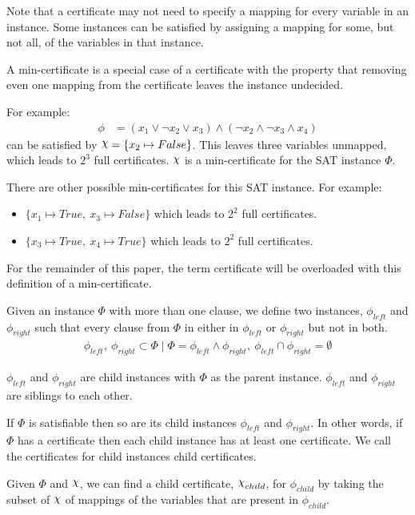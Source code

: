 Note that a certificate may not need to specify a mapping for every variable in an instance.
Some instances can be satisfied by assigning a mapping for some, but not all, of the variables in that instance.

\begin{definition}
\label{def:min-certificate}
    A min-certificate is a special case of a certificate with the property that removing even one mapping from the certificate leaves the instance undecided.
\end{definition}

For example:
\begin{align*}
    \phi & = (x_1 \lor \lnot x_2 \lor x_3) \land (\lnot x_2 \land \lnot x_3 \land x_4)
\end{align*}
can be satisfied by $ \rchi = \{ x_2 \mapsto False \} $.
This leaves three variables unmapped, which leads to $2^3$ full certificates.
$\rchi$ is a min-certificate for the SAT instance $\Phi$.

There are other possible min-certificates for this SAT instance.
For example:
\begin{itemize}
    \item $\{ x_1 \mapsto True,~ x_3 \mapsto False \}$ which leads to $2^2$ full certificates.
    \item $\{ x_3 \mapsto True,~ x_4 \mapsto True \}$ which leads to $2^2$ full certificates.
\end{itemize}

For the remainder of this paper, the term certificate will be overloaded with this definition of a min-certificate.

\begin{definition}
\label{def:child-instances}
    Given an instance $\Phi$ with more than one clause, we define two instances, $\phi_{left}$ and $\phi_{right}$ such that every clause from $\Phi$ in either in $\phi_{left}$ or $\phi_{right}$ but not in both.
    \begin{align*}
        \phi_{left},~ \phi_{right} \subset \Phi
        \mid \Phi = \phi_{left} \land \phi_{right},~
        \phi_{left} \cap \phi_{right} = \emptyset
    \end{align*}

    $\phi_{left}$ and $\phi_{right}$ are child instances with $\Phi$ as the parent instance.
    $\phi_{left}$ and $\phi_{right}$ are siblings to each other.
\end{definition}

\begin{definition}
\label{def:child-certificates}
    If $\Phi$ is satisfiable then so are its child instances $\phi_{left}$ and $\phi_{right}$.
    In other words, if $\Phi$ has a certificate then each child instance has at least one certificate.
    We call the certificates for child instances child certificates.

    Given $\Phi$ and $\rchi$, we can find a child certificate, $\rchi_{child}$, for $\phi_{child}$ by taking the subset of $\rchi$ of mappings of the variables that are present in $\phi_{child}$.
\end{definition}

